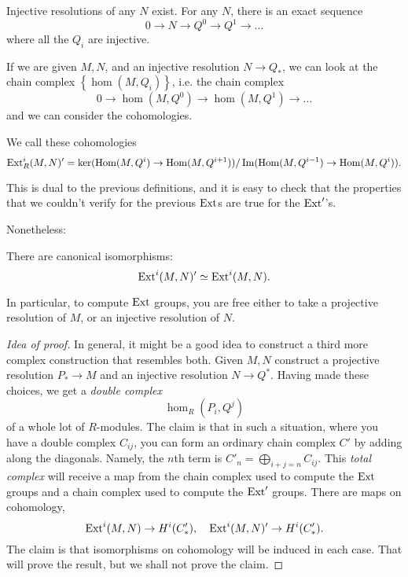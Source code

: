\begin{corollary}
Injective resolutions of any $N$ exist. For any $N$, there is an
exact sequence
\[ 0 \to N \to Q^0 \to Q^1 \to \dots  \]
where all the $Q_i$ are injective.
\end{corollary}

If we are given $M,N$, and an injective resolution $N \to Q_*$,
we can look at
the chain complex $\left\{\hom(M,Q_i)\right\}$, i.e. the chain
complex
\[ 0 \to \hom(M, Q^0) \to \hom(M, Q^1) \to \dots  \]
and we can consider the cohomologies.

\begin{definition}
We call these cohomologies
\[ \operatorname{Ext}^i_R(M,N)' = \ker(\operatorname{Hom}(M, Q^i) \to \operatorname{Hom}(M,
Q^{i+1}))/\operatorname{Im}(\operatorname{Hom}(M,
Q^{i-1}) \to \operatorname{Hom}(M, Q^i)).  \]
\end{definition}

This is dual to the previous definitions, and it is easy to
check that the
properties that we couldn't verify for the previous $\operatorname{Ext}$s are
true for the
$\operatorname{Ext}'$'s.

Nonetheless:

\begin{theorem}
There are canonical isomorphisms:
\[ \operatorname{Ext}^i(M,N)' \simeq \operatorname{Ext}^i(M,N).  \]
\end{theorem}

In particular, to compute $\operatorname{Ext}$ groups, you are free either to
take a
projective resolution of $M$, or an injective resolution of
$N$.\begin{proof}[Idea of proof]
In general, it might be a good idea to construct a third more
complex
construction that resembles both. Given $M,N$ construct a
projective resolution
$P_* \to M$ and an injective resolution $N \to Q^*$. Having made
these choices,
we get a \emph{double complex}
\[ \hom_R(P_i, Q^j)  \]
of a whole lot of $R$-modules. The claim is that in such a
situation, where
you have a double complex $C_{ij}$, you can
form an ordinary chain complex $C'$
by adding along the diagonals. Namely, the $n$th term
is $C'_n = \bigoplus_{i+j=n} C_{ij}$. This \emph{total complex}
will receive a
map from the chain complex used to compute the $\operatorname{Ext}$ groups
and a chain
complex used to compute the $\operatorname{Ext}'$ groups. There are maps on
cohomology,
\[ \operatorname{Ext}^i(M,N) \to H^i(C'_*), \quad \operatorname{Ext}^i(M,N)' \to H^i(C'_*).
\]
The claim is that isomorphisms on
cohomology will be induced in each case. That will prove the
result, but we
shall not prove the claim.
\end{proof}

